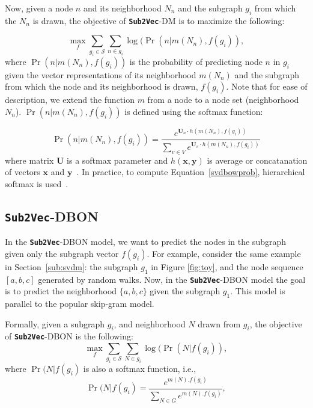 \documentclass[sigconf]{acmart}
\newcommand{\alg}{{\bf {\tt Sub2Vec}}\xspace}
\newcommand{\s}{\mathcal{S}}
\begin{document}
Now, given a node $n$ and its neighborhood $N_n$ and the subgraph $g_i$ from which the $N_n$ is drawn, the objective of \alg-DM is to maximize the following:

\begin{equation}
\max_{f}  \sum_{g_i \in \s} \sum_{n \in g_i} \log( \Pr(n | m(N_n), f(g_i)),
\end{equation}
where $\Pr(n | m(N_n), f(g_i))$ is the probability of predicting node $n$ in $g_i$ given the vector representations of its neighborhood $m(N_n)$ and the subgraph from which the node and its neighborhood is drawn, $f(g_i)$.  Note that for ease of description, we extend the function $m$ from a node to a node set (neighborhood $N_n$). $\Pr(n | m(N_n), f(g_i))$  is defined using the softmax function:

\begin{equation}
\label{svdbowprob}
\Pr(n | m(N_n), f(g_i) )= \frac{e^{\mathbf{U}_n \cdot h(m(N_n),f(g_i))}}{\sum_{v \in V} e^{\mathbf{U}_v \cdot h(m(N_n),f(g_i))}}
\end{equation}
where matrix $\mathbf{U}$ is a softmax parameter and $h(\mathbf{x},\mathbf{y})$ is average or concatanation of vectors $\mathbf{x}$ and $\mathbf{y}$~\cite{le2014distributed}. In practice, to compute Equation~\ref{svdbowprob}, hierarchical softmax is used~\cite{mikolov2013distributed}.
 

\subsection{\alg-DBON}

In the \alg-DBON model,  we want to predict the nodes in the subgraph given only the subgraph vector $f(g_i)$. 
For example, consider the same example in Section~\ref{sub:svdm}: the subgraph $g_1$  in Figure \ref{fig:toy}, and the node sequence $[a,b,c]$ generated by random walks. Now, in the \alg-DBON model the goal is to predict the neighborhood $\{a, b, c\}$ given the subgraph $g_1$. This model is parallel to the popular skip-gram model.


Formally, given a subgraph $g_i$, and neighborhood $N$ drawn from $g_i$, the objective of \alg-DBON is the following:
\begin{equation}
\max_{f}  \sum_{g_i \in \s} \sum_{N \in g_i} \log( \Pr(N | f(g_i)),
\end{equation}
where $\Pr(N | f(g_i)$ is also a softmax function, i.e., 
\begin{equation}
\label{softmax}
\Pr(N | f(g_i) = \frac{e^ {m(N). f(g_i)}}{\sum_{N \in G} e^{ m(N). f(g_i)}},
\end{equation}
\end{document}
